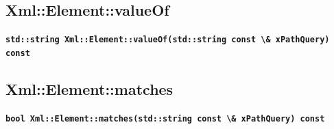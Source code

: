     \subsection{Xml::Element::valueOf}

    \textbf{\lstinline$std::string Xml::Element::valueOf(std::string const \& xPathQuery) const$}

    \subsection{Xml::Element::matches}

    \textbf{\lstinline$bool Xml::Element::matches(std::string const \& xPathQuery) const$}
